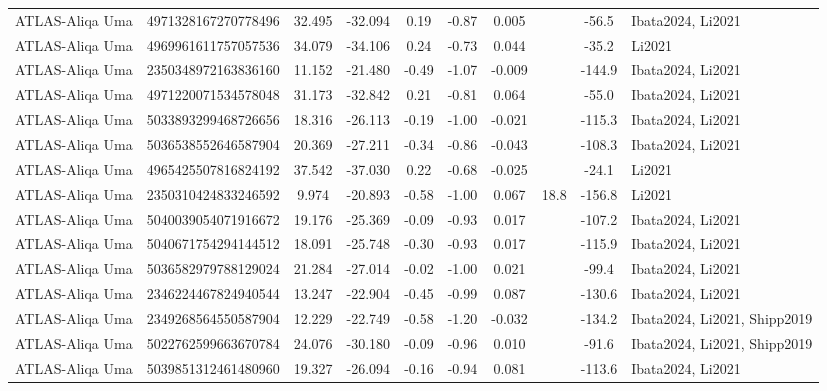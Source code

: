 \begin{tabular}{lcSSSSSSSl}
ATLAS-Aliqa Uma & 4971328167270778496 & 32.495 & -32.094 & 0.19 & -0.87 & 0.005 &  & -56.5 & Ibata2024, Li2021 \\
ATLAS-Aliqa Uma & 4969961611757057536 & 34.079 & -34.106 & 0.24 & -0.73 & 0.044 &  & -35.2 & Li2021 \\
ATLAS-Aliqa Uma & 2350348972163836160 & 11.152 & -21.480 & -0.49 & -1.07 & -0.009 &  & -144.9 & Ibata2024, Li2021 \\
ATLAS-Aliqa Uma & 4971220071534578048 & 31.173 & -32.842 & 0.21 & -0.81 & 0.064 &  & -55.0 & Ibata2024, Li2021 \\
ATLAS-Aliqa Uma & 5033893299468726656 & 18.316 & -26.113 & -0.19 & -1.00 & -0.021 &  & -115.3 & Ibata2024, Li2021 \\
ATLAS-Aliqa Uma & 5036538552646587904 & 20.369 & -27.211 & -0.34 & -0.86 & -0.043 &  & -108.3 & Ibata2024, Li2021 \\
ATLAS-Aliqa Uma & 4965425507816824192 & 37.542 & -37.030 & 0.22 & -0.68 & -0.025 &  & -24.1 & Li2021 \\
ATLAS-Aliqa Uma & 2350310424833246592 & 9.974 & -20.893 & -0.58 & -1.00 & 0.067 & 18.8 & -156.8 & Li2021 \\
ATLAS-Aliqa Uma & 5040039054071916672 & 19.176 & -25.369 & -0.09 & -0.93 & 0.017 &  & -107.2 & Ibata2024, Li2021 \\
ATLAS-Aliqa Uma & 5040671754294144512 & 18.091 & -25.748 & -0.30 & -0.93 & 0.017 &  & -115.9 & Ibata2024, Li2021 \\
ATLAS-Aliqa Uma & 5036582979788129024 & 21.284 & -27.014 & -0.02 & -1.00 & 0.021 &  & -99.4 & Ibata2024, Li2021 \\
ATLAS-Aliqa Uma & 2346224467824940544 & 13.247 & -22.904 & -0.45 & -0.99 & 0.087 &  & -130.6 & Ibata2024, Li2021 \\
ATLAS-Aliqa Uma & 2349268564550587904 & 12.229 & -22.749 & -0.58 & -1.20 & -0.032 &  & -134.2 & Ibata2024, Li2021, Shipp2019 \\
ATLAS-Aliqa Uma & 5022762599663670784 & 24.076 & -30.180 & -0.09 & -0.96 & 0.010 &  & -91.6 & Ibata2024, Li2021, Shipp2019 \\
ATLAS-Aliqa Uma & 5039851312461480960 & 19.327 & -26.094 & -0.16 & -0.94 & 0.081 &  & -113.6 & Ibata2024, Li2021 \\
\hline
\end{tabular}